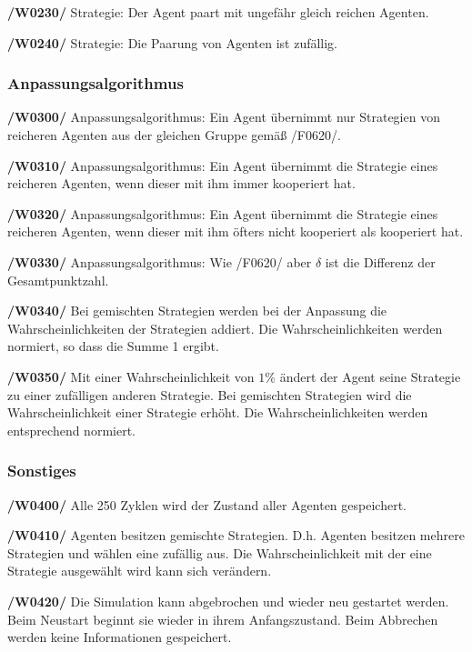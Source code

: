 \textbf{/W0230/}
Strategie: Der Agent paart mit ungefähr gleich reichen Agenten.

\textbf{/W0240/}
Strategie: Die Paarung von Agenten ist zufällig.

\subsubsection{Anpassungsalgorithmus}

\textbf{/W0300/}
Anpassungsalgorithmus: Ein Agent übernimmt nur Strategien von reicheren Agenten aus der gleichen Gruppe gemäß /F0620/.

\textbf{/W0310/}
Anpassungsalgorithmus: Ein Agent übernimmt die Strategie eines reicheren Agenten, wenn dieser mit ihm immer kooperiert hat.

\textbf{/W0320/}
Anpassungsalgorithmus: Ein Agent übernimmt die Strategie eines reicheren Agenten, wenn dieser mit ihm öfters nicht kooperiert als kooperiert hat.

\textbf{/W0330/}
Anpassungsalgorithmus: Wie /F0620/ aber $\delta$ ist die Differenz der Gesamtpunktzahl.

\textbf{/W0340/}
Bei gemischten Strategien werden bei der Anpassung die Wahrscheinlichkeiten der Strategien addiert. Die Wahrscheinlichkeiten werden normiert, so dass die Summe 1 ergibt.

\textbf{/W0350/}
Mit einer Wahrscheinlichkeit von $1\%$ ändert der Agent seine Strategie zu einer zufälligen anderen Strategie. Bei gemischten Strategien wird die Wahrscheinlichkeit einer Strategie erhöht. Die Wahrscheinlichkeiten werden entsprechend normiert.

\subsubsection{Sonstiges}

\textbf{/W0400/}
Alle 250 Zyklen wird der Zustand aller Agenten gespeichert.

\textbf{/W0410/}
Agenten besitzen gemischte Strategien. D.h. Agenten besitzen mehrere Strategien und wählen eine zufällig aus. Die Wahrscheinlichkeit mit der eine Strategie ausgewählt wird kann sich verändern.

\textbf{/W0420/}
Die Simulation kann abgebrochen und wieder neu gestartet werden. Beim Neustart beginnt sie wieder in ihrem Anfangszustand. Beim Abbrechen werden keine Informationen gespeichert.